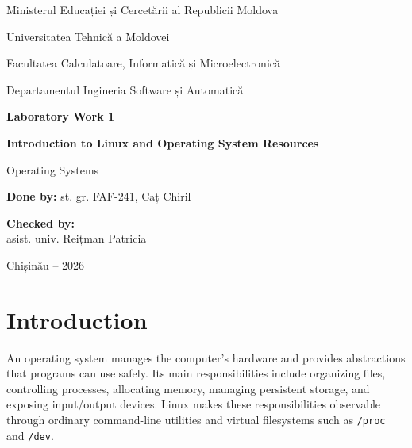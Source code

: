 \documentclass[12pt]{article}
\newcommand{\commandname}[1]{\texttt{#1}}
\begin{document}

\begin{titlepage}
    \centering

    {\large Ministerul Educației și Cercetării al Republicii Moldova\par}
    \vspace{0.45cm}
    {\large Universitatea Tehnică a Moldovei\par}
    \vspace{0.45cm}
    {\large Facultatea Calculatoare, Informatică și Microelectronică\par}
    \vspace{0.45cm}
    {\large Departamentul Ingineria Software și Automatică\par}

    \vspace{3cm}

    {\Large\bfseries Laboratory Work 1\par}
    \vspace{0.55cm}
    {\LARGE\bfseries Introduction to Linux and Operating System Resources\par}
    \vspace{0.35cm}
    {\large Operating Systems\par}

    \vfill

    \begin{flushleft}
        \textbf{Done by:} st. gr. FAF-241, Caț Chiril

        \vspace{1cm}

        \textbf{Checked by:}\\
        asist. univ. Reițman Patricia
    \end{flushleft}

    \vfill

    {Chișinău -- 2026\par}
\end{titlepage}

\tableofcontents
\clearpage
{}

\section{Introduction}

An operating system manages the computer's hardware and provides abstractions that programs can use safely. Its main responsibilities include organizing files, controlling processes, allocating memory, managing persistent storage, and exposing input/output devices. Linux makes these responsibilities observable through ordinary command-line utilities and virtual filesystems such as \commandname{/proc} and \commandname{/dev}.
\end{document}

